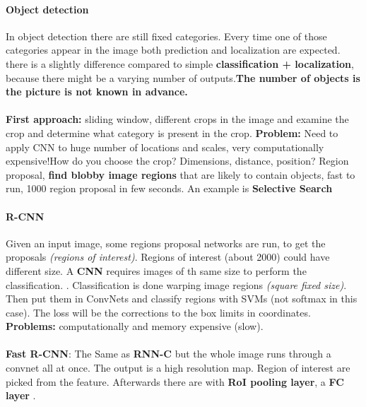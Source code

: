 \documentclass[11pt]{article}
\begin{document}
\paragraph{Object detection}
In object detection there are still fixed categories. Every time one of those categories appear in the image both prediction and localization are expected. there is a slightly difference compared to simple \textbf{classification + localization}, because there might be a varying number of outputs.\textbf{The number of objects is the picture is not known in advance.}\\\\
\textbf{First approach:} sliding window, different crops in the image and examine the crop and determine what category is present in the crop. \textbf{Problem:} Need to apply CNN to huge number of locations and scales, very computationally expensive!How do you choose the crop? Dimensions, distance, position?
Region proposal, \textbf{find blobby image regions} that are likely to contain objects, fast to run, 1000 region proposal in few seconds. An example is \textbf{Selective Search}
\paragraph{R-CNN}
Given an input image, some regions proposal networks are run, to get the proposals \textit{(regions of interest)}.
Regions of interest (about 2000) could have different size. A \textbf{CNN}  requires images of th  same size to perform the classification. . Classification is done warping image regions \textit{(square fixed size)}.
Then put them in ConvNets and classify regions with SVMs (not softmax in this case).
The loss will be the corrections to the box limits in coordinates.
\textbf{Problems: } computationally and memory expensive (slow).\\\\
\textbf{Fast R-CNN}: The Same as \textbf{RNN-C} but the whole image runs through a convnet all at once. The output is a high resolution map. Region of interest are picked from the feature. Afterwards there are with \textbf{RoI pooling layer}, a \textbf{FC layer} .
\end{document}
